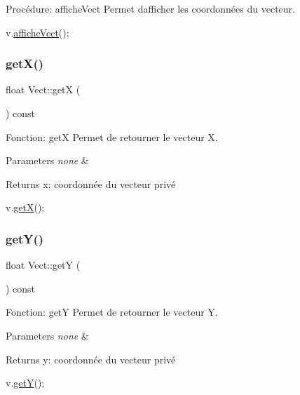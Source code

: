 Procédure\+: affiche\+Vect Permet d\textquotesingle{}afficher les coordonnées du vecteur. 


\begin{DoxyCode}
v.\hyperlink{classVect_a11f0af5e83cd9c4605c37e0b98eff8c0}{afficheVect}();
\end{DoxyCode}
 \mbox{\label{classVect_a8925192fe8666b52b2385ff006ab3213}} 
\subsubsection{\texorpdfstring{get\+X()}{getX()}}
{\footnotesize\ttfamily float Vect\+::getX (\begin{DoxyParamCaption}{ }\end{DoxyParamCaption}) const}



Fonction\+: getX Permet de retourner le vecteur X. 


\begin{DoxyParams}{Parameters}
{\em none} & \\
\hline
\end{DoxyParams}
\begin{DoxyReturn}{Returns}
x\+: coordonnée du vecteur privé 
\begin{DoxyCode}
v.\hyperlink{classVect_a8925192fe8666b52b2385ff006ab3213}{getX}();
\end{DoxyCode}
 
\end{DoxyReturn}
\mbox{\label{classVect_a2e44111683aae147cd053ac6002f5992}} 
\subsubsection{\texorpdfstring{get\+Y()}{getY()}}
{\footnotesize\ttfamily float Vect\+::getY (\begin{DoxyParamCaption}{ }\end{DoxyParamCaption}) const}



Fonction\+: getY Permet de retourner le vecteur Y. 


\begin{DoxyParams}{Parameters}
{\em none} & \\
\hline
\end{DoxyParams}
\begin{DoxyReturn}{Returns}
y\+: coordonnée du vecteur privé 
\begin{DoxyCode}
v.\hyperlink{classVect_a2e44111683aae147cd053ac6002f5992}{getY}();
\end{DoxyCode}
 
\end{DoxyReturn}
\mbox{\label{classVect_aa61c71b79a4d2f2cda092648a7268c4f}} 
